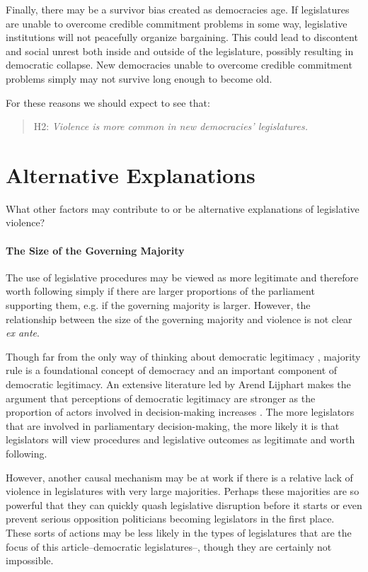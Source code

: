 \documentclass[a4paper]{article}\usepackage[]{graphicx}\usepackage[]{color}
\begin{document}
Finally, there may be a survivor bias created as democracies age. If legislatures are unable to overcome credible commitment problems in some way, legislative institutions will not peacefully organize bargaining. This could lead to discontent and social unrest both inside and outside of the legislature, possibly resulting in democratic collapse. New democracies unable to overcome credible commitment problems simply may not survive long enough to become old.

For these reasons we should expect to see that:

\begin{quote}
    H2: \emph{Violence is more common in new democracies' legislatures.}
\end{quote}

\section*{Alternative Explanations}

What other factors may contribute to or be alternative explanations of legislative violence?

\paragraph{The Size of the Governing Majority}

The use of legislative procedures may be viewed as more legitimate and therefore worth following simply if there are larger proportions of the parliament supporting them, e.g. if the governing majority is larger. However, the relationship between the size of the governing majority and violence is not clear \emph{ex ante}.

Though far from the only way of thinking about democratic legitimacy \citep{Follesdal2006}, majority rule is a foundational concept of democracy \citep{Dahl1989} and an important component of democratic legitimacy. An extensive literature led by Arend Lijphart makes the argument that perceptions of democratic legitimacy are stronger as the proportion of actors involved in decision-making increases \citeyearpar[]{Lijphart2007}. The more legislators that are involved in parliamentary decision-making, the more likely it is that legislators will view procedures and legislative outcomes as legitimate and worth following.

However, another causal mechanism may be at work if there is a relative lack of violence in legislatures with very large majorities. Perhaps these majorities are so powerful that they can quickly quash legislative disruption before it starts or even prevent serious opposition politicians becoming legislators in the first place. These sorts of actions may be less likely in the types of legislatures that are the focus of this article--democratic legislatures--, though they are certainly not impossible.
\end{document}
